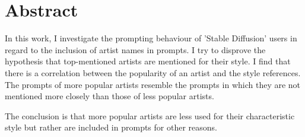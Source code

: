 \section*{Abstract}
\label{sec:Abstract}

In this work, I investigate the prompting behaviour of 'Stable Diffusion' users in regard to the inclusion of artist names in prompts. I try to disprove the hypothesis that top-mentioned artists are mentioned for their style. I find that there is a correlation between the popularity of an artist and the style references. The prompts of more popular artists resemble the prompts in which they are not mentioned more closely than those of less popular artists.

The conclusion is that more popular artists are less used for their characteristic style but rather are included in prompts for other reasons.
